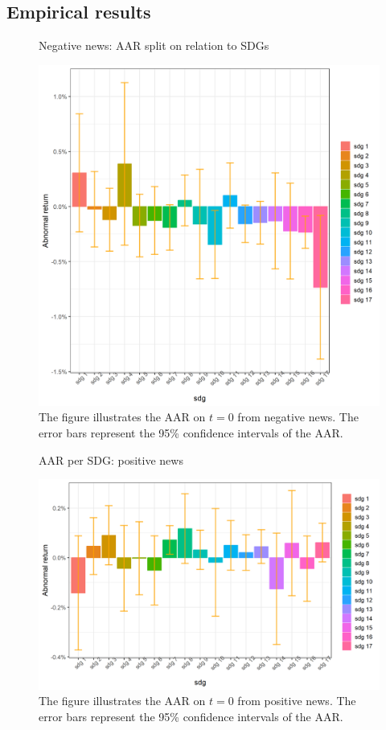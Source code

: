 
\subsection{Empirical results}

\begin{figure} [H]
    \centering
    \caption{Negative news: AAR split on relation to SDGs}
    \includegraphics[scale=0.6]{Projekt/1.Figures analysis/ST_negative_sdg_bar.png}
    \caption*{\footnotesize The figure illustrates the AAR on $t = 0$ from negative news. The error bars represent the 95\% confidence intervals of the AAR.}
    \label{fig:ST_neg_bar}
\end{figure}

\begin{figure} [H]
    \centering
    \caption{AAR per SDG: positive news}
    \includegraphics[scale=0.6]{Projekt/1.Figures analysis/ST_positive_sdg_bar.png}
    \caption*{\footnotesize The figure illustrates the AAR on $t = 0$ from positive news. The error bars represent the 95\% confidence intervals of the AAR.}
    \label{fig:ST_pos_bar}
\end{figure}




